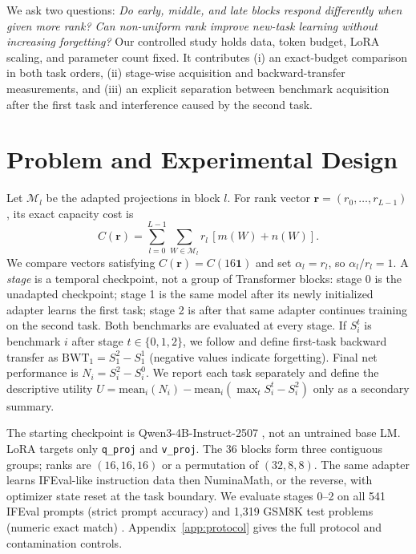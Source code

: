 \documentclass{article}
\begin{document}
We ask two questions: \emph{Do early, middle, and late blocks respond
differently when given more rank? Can non-uniform rank improve new-task
learning without increasing forgetting?} Our controlled study holds data,
token budget, LoRA scaling, and parameter count fixed. It contributes (i) an
exact-budget comparison in both task orders, (ii) stage-wise acquisition and
backward-transfer measurements, and (iii) an explicit separation between
benchmark acquisition after the first task and interference caused by the
second task.

\section{Problem and Experimental Design}
Let $\mathcal{M}_l$ be the adapted projections in block $l$. For rank vector
$\mathbf r=(r_0,\ldots,r_{L-1})$, its exact capacity cost is
\begin{equation}
 C(\mathbf r)=\sum_{l=0}^{L-1}\sum_{W\in\mathcal{M}_l}
 r_l\,[m(W)+n(W)].
 \label{eq:budget}
\end{equation}
We compare vectors satisfying $C(\mathbf r)=C(16\mathbf 1)$ and set
$\alpha_l=r_l$, so $\alpha_l/r_l=1$. A \emph{stage} is a temporal checkpoint,
not a group of Transformer blocks: stage 0 is the unadapted checkpoint; stage
1 is the same model after its newly initialized adapter learns the first task;
stage 2 is after that same adapter continues training on the second task. Both
benchmarks are evaluated at every stage. If $S_i^t$ is benchmark $i$ after
stage $t\in\{0,1,2\}$, we follow \citet{lopezpaz2017gem} and define first-task
backward transfer as $\mathrm{BWT}_1=S_1^2-S_1^1$ (negative values indicate
forgetting). Final net performance is $N_i=S_i^2-S_i^0$. We report each task
separately and define the descriptive utility
$U=\mathrm{mean}_i(N_i)-\mathrm{mean}_i(\max_t S_i^t-S_i^2)$ only as a
secondary summary.

The starting checkpoint is Qwen3-4B-Instruct-2507 \citep{qwen3report}, not an
untrained base LM. LoRA targets only \texttt{q\_proj} and \texttt{v\_proj}.
The 36 blocks form three contiguous groups; ranks are $(16,16,16)$ or a
permutation of $(32,8,8)$. The same adapter learns IFEval-like instruction
data then NuminaMath, or the reverse, with optimizer state reset at the task
boundary. We evaluate stages 0--2 on all 541 IFEval prompts (strict prompt
accuracy) and 1,319 GSM8K test problems (numeric exact match)
\citep{zhou2023ifeval,cobbe2021gsm8k}. Appendix~\ref{app:protocol} gives the
full protocol and contamination controls.
\end{document}
